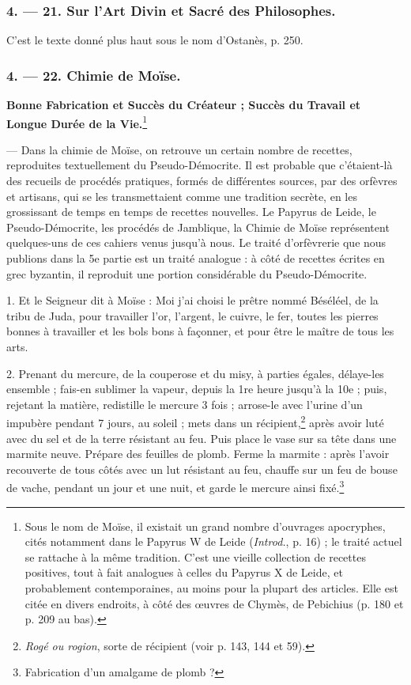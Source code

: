 \documentclass[a4paper, 11pt, oneside, polutonikogreek, french]{article}
\begin{document}
\bigskip
\centerline{\EightStarTaper}
\centerline{\EightStarTaper\EightStarTaper}
\bigskip

\subsubsection{4. --- 21. Sur l'Art Divin et Sacré des Philosophes.}

C'est le texte donné plus haut sous le nom d'Ostanès, p. 250.

\bigskip
\centerline{\EightStarTaper}
\centerline{\EightStarTaper\EightStarTaper}
\bigskip

\subsubsection{4. --- 22. Chimie de Moïse.}

\textbf{Bonne Fabrication et Succès du Créateur ; Succès du Travail et Longue Durée de la Vie.}\footnote{Sous le nom de Moïse, il existait un grand nombre d'ouvrages apocryphes, cités notamment dans le Papyrus W de Leide (\emph{Introd.}, p. 16) ; le traité actuel se rattache à la même tradition. C'est une vieille collection de recettes positives, tout à fait analogues à celles du Papyrus X de Leide, et probablement contemporaines, au moins pour la plupart des articles. Elle est citée en divers endroits, à côté des œuvres de Chymès, de Pebichius (p. 180 et p. 209 au bas).  }

--- Dans la chimie de Moïse, on retrouve un certain nombre de recettes, reproduites textuellement du Pseudo-Démocrite. Il est probable que c'étaient-là des recueils de procédés pratiques, formés de différentes sources, par des orfèvres et artisans, qui se les transmettaient comme une tradition secrète, en les grossissant de temps en temps de recettes nouvelles. Le Papyrus de Leide, le Pseudo-Démocrite, les procédés de Jamblique, la Chimie de Moïse représentent quelques-uns de ces cahiers venus jusqu'à nous. Le traité d'orfèvrerie que nous publions dans la 5e partie est un traité analogue : à côté de recettes écrites en grec byzantin, il reproduit une portion considérable du Pseudo-Démocrite.

1. Et le Seigneur dit à Moïse : Moi j'ai choisi le prêtre nommé Béséléel, de la tribu de Juda, pour travailler l'or, l'argent, le cuivre, le fer, toutes les pierres bonnes à travailler et les bols bons à façonner, et pour être le maître de tous les arts.

2. Prenant du mercure, de la couperose et du misy, à parties égales, délaye-les ensemble ; fais-en sublimer la vapeur, depuis la 1re heure jusqu'à la 10e ; puis, rejetant la matière, redistille le mercure 3 fois ; arrose-le avec l'urine d'un impubère pendant 7 jours, au soleil ; mets dans un récipient,\footnote{\emph{Rogé ou rogion}, sorte de récipient (voir p. 143, 144 et 59).} après avoir luté avec du sel et de la terre résistant au feu. Puis place le vase sur sa tête dans une marmite neuve. Prépare des feuilles de plomb. Ferme la marmite : après l'avoir recouverte de tous côtés avec un lut résistant au feu, chauffe sur un feu de bouse de vache, pendant un jour et une nuit, et garde le mercure ainsi fixé.\footnote{Fabrication d'un amalgame de plomb ?}
\end{document}
